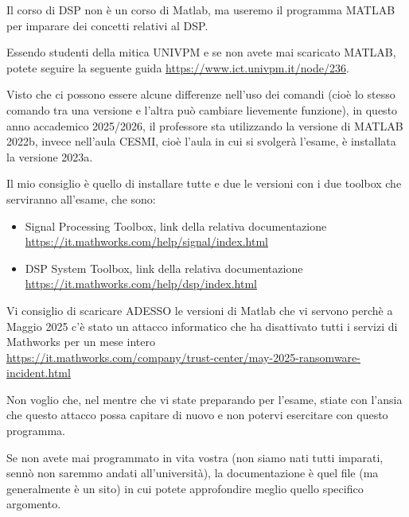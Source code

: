 \begin{tcolorbox}
    Il corso di DSP non è un corso di Matlab, ma useremo il programma MATLAB per imparare dei concetti relativi al DSP. \newline 

    Essendo studenti della mitica UNIVPM e se non avete mai scaricato MATLAB, 
    potete seguire la seguente guida \url{https://www.ict.univpm.it/node/236}. \newline 

    Visto che ci possono essere alcune differenze nell'uso dei comandi (cioè lo stesso comando tra una versione e l'altra può cambiare lievemente funzione), 
    in questo anno accademico 2025/2026, 
    il professore sta utilizzando la versione di MATLAB 2022b, invece nell'aula CESMI, cioè l'aula in cui si svolgerà l'esame, 
    è installata la versione 2023a. \newline 

    Il mio consiglio è quello di installare tutte e due le versioni con i due toolbox che serviranno all'esame, che sono: 
    
    \begin{itemize}
        \item Signal Processing Toolbox, link della relativa documentazione \\\url{https://it.mathworks.com/help/signal/index.html}
        \item DSP System Toolbox, link della relativa documentazione \\\url{https://it.mathworks.com/help/dsp/index.html}  
    \end{itemize}
    
    Vi consiglio di scaricare ADESSO le versioni di Matlab che vi servono perchè a Maggio 2025 c'è stato un attacco informatico che ha disattivato tutti i servizi di Mathworks per un mese intero\\ 
    \url{https://it.mathworks.com/company/trust-center/may-2025-ransomware-incident.html} \newline 
    
    Non voglio che, nel mentre che vi state preparando per l'esame, stiate con l'ansia che questo attacco possa capitare di nuovo e non potervi esercitare con questo programma. \newline 

    Se non avete mai programmato in vita vostra (non siamo nati tutti imparati, sennò non saremmo andati all'università), 
    la documentazione è quel file (ma generalmente è un sito) in cui potete approfondire meglio quello specifico argomento. \newline 


\end{tcolorbox}
